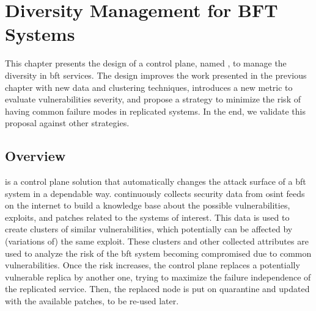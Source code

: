 \chapter{Diversity Management for BFT Systems} 
\label{chap:lazarus_design}

This chapter presents the design of a control plane, named \system, to manage the diversity in \gls{bft} services.
The design improves the work presented in the previous chapter with new data and clustering techniques, introduces a new metric to evaluate vulnerabilities severity, and propose a strategy to minimize the risk of having common failure modes in replicated systems.
In the end, we validate this proposal against other strategies.


\section{Overview}
\system is a control plane solution that automatically changes the attack surface of a \gls{bft} system in a dependable way.
\system continuously collects security data from \gls{osint} feeds on the internet to build a knowledge base about the possible vulnerabilities, exploits, and patches related to the systems of interest.
This data is used to create clusters of similar vulnerabilities, which potentially can be affected by (variations of) the same exploit.
These clusters and other collected attributes are used to analyze the risk of the \gls{bft} system becoming compromised due to common vulnerabilities.
Once the risk increases, the control plane replaces a potentially vulnerable replica by another one, trying to maximize the failure independence of the replicated service.
Then, the replaced node is put on quarantine and updated with the available patches, to be re-used later.





